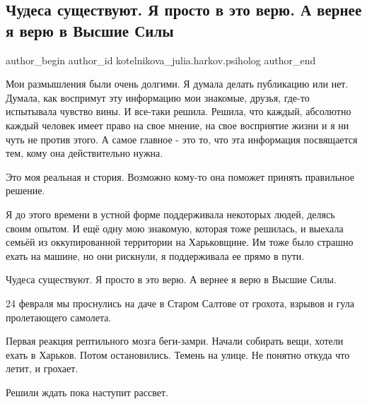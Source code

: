  
 
 
 
 
 
\subsection{Чудеса существуют. Я просто в это верю. А вернее я верю в Высшие Силы}
\label{sec:16_04_2022.fb.kotelnikova_julia.harkov.psiholog.1.chudesa}
 
\ifcmt
 author_begin
   author_id kotelnikova_julia.harkov.psiholog
 author_end
\fi

Мои размышления были очень долгими. Я думала делать публикацию или нет. Думала,
как воспримут эту информацию мои знакомые, друзья,  где-то  испытывала чувство
вины. И все-таки решила. Решила, что каждый, абсолютно каждый человек имеет
право на свое мнение, на свое восприятие жизни и я ни чуть не против этого. А
самое главное - это то, что эта информация посвящается тем, кому она
действительно нужна.

Это моя реальная и стория.  Возможно кому-то она поможет принять правильное
решение. 

Я до этого времени в устной форме поддерживала некоторых людей,  делясь своим
опытом.  И ещё одну мою знакомую, которая тоже решилась, и выехала семьёй из
оккупированной  территории на Харьковщине. Им тоже было страшно ехать на
машине, но они рискнули, я  поддерживала ее прямо в пути.

Чудеса существуют. Я просто в это верю. А вернее я верю в Высшие Силы.

24 февраля мы проснулись на даче в Старом Салтове от грохота, взрывов и гула
пролетающего самолета.

 Первая реакция рептильного мозга беги-замри. Начали собирать вещи, хотели
 ехать в Харьков. Потом остановились. Темень на улице. Не понятно откуда что
 летит, и грохает.

Решили ждать пока наступит рассвет.

